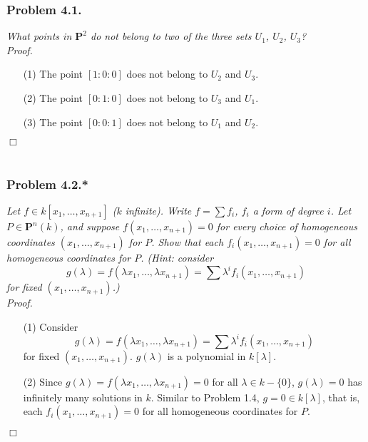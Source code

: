 \documentclass{article}
\begin{document}
\subsubsection*{Problem 4.1.}
\emph{What points in $\mathbf{P}^{2}$ do not belong to two of the three sets $U_1$, $U_2$, $U_3$?} \\



\emph{Proof.}
\begin{enumerate}
\item[(1)]
  The point $[1:0:0]$ does not belong to $U_2$ and $U_3$.

\item[(2)]
  The point $[0:1:0]$ does not belong to $U_3$ and $U_1$.

\item[(3)]
  The point $[0:0:1]$ does not belong to $U_1$ and $U_2$.
\end{enumerate}
$\Box$ \\\\






\subsubsection*{Problem 4.2.*}
\emph{Let $f \in k[x_1,\ldots,x_{n+1}]$ ($k$ infinite).
Write $f = \sum f_i$, $f_i$ a form of degree $i$.
Let $P \in \mathbf{P}^{n}(k)$, and suppose $f(x_1,\ldots,x_{n+1}) = 0$
for every choice of homogeneous coordinates $(x_1,\ldots,x_{n+1})$ for $P$.
Show that each $f_i(x_1,\ldots,x_{n+1}) = 0$ for all homogeneous coordinates for $P$.
(Hint: consider
\[
  g(\lambda) = f(\lambda x_1, \ldots, \lambda x_{n+1}) = \sum \lambda^i f_i(x_1,\ldots,x_{n+1})
\]
for fixed $(x_1,\ldots,x_{n+1})$.)} \\



\emph{Proof.}
\begin{enumerate}
\item[(1)]
  Consider
  \[
    g(\lambda)
    = f(\lambda x_1, \ldots, \lambda x_{n+1})
    = \sum \lambda^i f_i(x_1,\ldots,x_{n+1})
  \]
  for fixed $(x_1,\ldots,x_{n+1})$.
  $g(\lambda)$ is a polynomial in $k[\lambda]$.

\item[(2)]
  Since $g(\lambda) = f(\lambda x_1, \ldots, \lambda x_{n+1}) = 0$ for all $\lambda \in k - \{ 0 \}$,
  $g(\lambda) = 0$ has infinitely many solutions in $k$.
  Similar to Problem 1.4, $g = 0 \in k[\lambda]$,
  that is,
  each $f_i(x_1,\ldots,x_{n+1}) = 0$ for all homogeneous coordinates for $P$.
\end{enumerate}
$\Box$ \\\\
\end{document}
